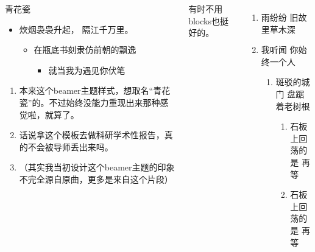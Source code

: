 \documentclass[t,linespread=1.2]{ctexbeamer}
\begin{document}
\begin{frame}
\begin{columns}[T]
    
    \begin{block}{青花瓷}
        \begin{itemize}
            \item 炊烟袅袅升起， 隔江千万里。
            \begin{itemize}
                \item 在瓶底书刻隶仿前朝的飘逸
                \begin{itemize}
                    \item 就当我为遇见你伏笔
                \end{itemize}
            \end{itemize}
        \end{itemize}
        
        \begin{enumerate}
            \item 本来这个beamer主题样式，想取名“青花瓷”的。不过始终没能力重现出来那种感觉啦，就算了。
            \item 话说拿这个模板去做科研学术性报告，真的不会被导师丢出来吗。
            \item \begin{minipage}[t]{.8\hsize}（其实我当初设计这个beamer主题的印象不完全源自原曲，更多是来自这个片段）\end{minipage}\quad
        \end{enumerate}
    \end{block}

    有时不用blocks也挺好的。
    \begin{enumerate}
        \item 雨纷纷 旧故里草木深
        \item 我听闻 你始终一个人
        \begin{enumerate}
            \item 斑驳的城门 盘踞着老树根
            \begin{enumerate}
                \item 石板上回荡的是 再等
                \item 石板上回荡的是 再等
            \end{enumerate}
        \end{enumerate}
    \end{enumerate}
\end{columns}


\end{frame}
\end{document}
